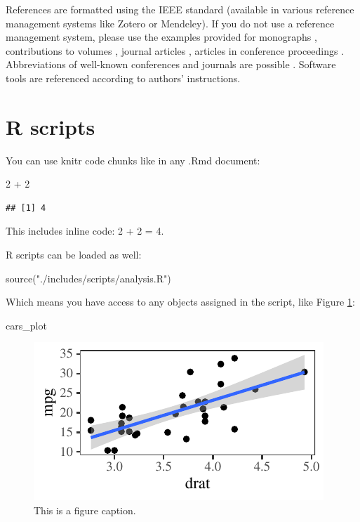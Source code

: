 \documentclass[
  a4paper,
  11pt,
  twocolumn]{article}
\newenvironment{Shaded}{\begin{snugshade}}{\end{snugshade}}
\newcommand{\DecValTok}[1]{\textcolor[rgb]{0.86,0.86,0.80}{#1}}
\newcommand{\FunctionTok}[1]{\textcolor[rgb]{0.94,0.94,0.56}{#1}}
\newcommand{\NormalTok}[1]{\textcolor[rgb]{0.80,0.80,0.80}{#1}}
\newcommand{\SpecialCharTok}[1]{\textcolor[rgb]{0.86,0.64,0.64}{#1}}
\newcommand{\StringTok}[1]{\textcolor[rgb]{0.80,0.58,0.58}{#1}}
\begin{document}
References are formatted using the IEEE standard (available in various
reference management systems like Zotero or Mendeley). If you do not use
a reference management system, please use the examples provided for
monographs \cite{Fant:1960}, contributions to volumes
\cite{Stevens:1999}, journal articles \cite{Beattie/etal:1982}, articles
in conference proceedings \cite{Ladefoged:2003}. Abbreviations of
well-known conferences and journals are possible
\cite{Peterson/Barney:1952}. Software tools \cite{Boril/Skarnitzl:2016}
are referenced according to authors' instructions.

\section{R scripts}

You can use knitr code chunks like in any .Rmd document:

\begin{Shaded}
\begin{Highlighting}[]
\DecValTok{2} \SpecialCharTok{+} \DecValTok{2}
\end{Highlighting}
\end{Shaded}

\begin{verbatim}
## [1] 4
\end{verbatim}

This includes inline code: 2 + 2 = 4.

R scripts can be loaded as well:

\begin{Shaded}
\begin{Highlighting}[]
\FunctionTok{source}\NormalTok{(}\StringTok{"./includes/scripts/analysis.R"}\NormalTok{)}
\end{Highlighting}
\end{Shaded}

Which means you have access to any objects assigned in the script, like
Figure \ref{fig:ex_plot}:

\begin{Shaded}
\begin{Highlighting}[]
\NormalTok{cars\_plot}
\end{Highlighting}
\end{Shaded}

\begin{figure}[!h]
\caption{This is a figure caption.}\label{fig:ex_plot}


\begin{center}\includegraphics{main_files/figure-latex/ex_plot-1} \end{center}

\end{figure}




\theendnotes
\end{document}
